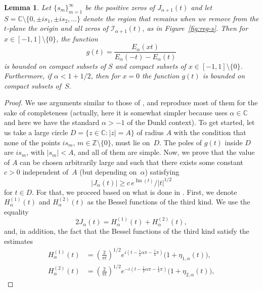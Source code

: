 \documentclass[a4paper]{amsart}
\newcommand{\Z}{\mathbb{Z}}
\newcommand{\C}{\mathbb{C}}
\newcommand{\I}{\mathcal{I}}
\newcommand{\Ea}{E_{\alpha}}
\renewcommand{\Im}{\operatorname{Im}}
\theoremstyle{plain}
\newtheorem{lemma}[theorem]{Lemma}
\theoremstyle{definition}
\theoremstyle{remark}
\numberwithin{equation}{section}
\begin{document}
\begin{lemma}
\label{lem:acot-g}
Let $\{s_m\}_{m=1}^{\infty}$ be the positive zeros of $J_{\alpha+1}(t)$
and let $S=\C\setminus\{0,\pm is_1,\allowbreak \pm is_2, \dots \}$ denote the region that remains when we remove from the $t$-plane the origin and all zeros of $\I_{\alpha+1}(t)$, as in Figure~\ref{fig:reg-s}. Then for $x\in [-1,1]\setminus \{0\}$, the function 
\[
g(t) = \frac{\Ea(xt)}{\Ea(-t)-\Ea(t)}
\]
is bounded on compact subsets of $S$ and compact subsets of $x\in [-1,1]\setminus \{0\}$.
Furthermore, if $\alpha < 1+1/2$, then for $x=0$ the function $g(t)$ is bounded on compact subsets of~$S$.
\end{lemma}

\begin{proof}
We use arguments similar to those of \cite[\S\,2]{DPV}, and reproduce most of them for the sake of completeness (actually, here it is somewhat simpler because \cite{DPV} uses $\alpha\in\C$ and here we have the standard $\alpha>-1$ of the Dunkl context). 
To get started, let us take a large circle $D=\{z\in\C : |z|=A\}$ of radius $A$ with the condition that none of the points $i s_m$, $m\in \Z\setminus\{0\}$, must lie on~$D$. The poles of $g(t)$ inside $D$ are $i s_m$, with $|s_m| < A$, and all of them are simple.
Now, we prove that the value of $A$ can be chosen arbitrarily large and such that there exists some constant $c > 0$ independent of~$A$ (but depending on~$\alpha$) satisfying
\begin{equation}
\label{eq:cotas2}
    |J_{\alpha}(t)| \geq c\, {e^{\Im(t)}}/{|t|^{1/2}}
\end{equation}
for $t\in D$. For that, we proceed based on what is done in \cite[\S\,15.41, p.~498]{Wat}. First, we denote $H^{(1)}_{\alpha}(t)$ and $H^{(2)}_{\alpha}(t)$ as the Bessel functions of the third kind.  We use the equality
\begin{equation}
\label{eq:JH1H2}
   2J_{\alpha}(t) = H^{(1)}_{\alpha}(t) + H^{(2)}_{\alpha}(t),
\end{equation}
and, in addition, the fact that the Bessel functions of the third kind satisfy the estimates
\begin{align}
\label{eq:estH1}
   H_{\alpha}^{(1)}(t) &= \left(\frac{2}{\pi t}\right)^{1/2}
   e^{i(t-\frac{1}{2}\alpha\pi - \frac{1}{4}\pi)}
   \Big( 1 + \eta_{1,\alpha}(t) \Big),
   \\
\label{eq:estH2}
   H_{\alpha}^{(2)}(t) &= \left(\frac{2}{\pi t}\right)^{1/2}
   e^{-i(t-\frac{1}{2}\alpha\pi - \frac{1}{4}\pi)}
   \Big( 1 + \eta_{2,\alpha}(t) \Big),

\end{align}
\end{proof}
\end{document}
